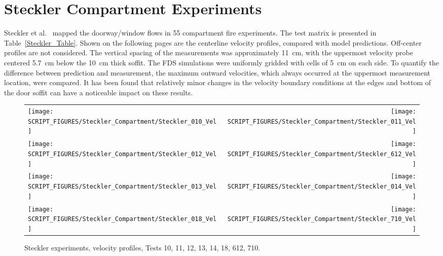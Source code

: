 \clearpage

\section{Steckler Compartment Experiments}

Steckler et al.~\cite{Steckler:NBSIR_82-2520} mapped the doorway/window flows in 55 compartment fire experiments. The test matrix is presented in Table~\ref{Steckler_Table}. Shown on the following pages are the centerline velocity profiles, compared with model predictions. Off-center profiles are not considered. The vertical spacing of the measurements was approximately 11~cm, with the uppermost velocity probe centered 5.7~cm below the 10~cm thick soffit. The FDS simulations were uniformly gridded with cells of 5~cm on each side. To quantify the difference between prediction and measurement, the maximum outward velocities, which always occurred at the uppermost measurement location, were compared. It has been found that relatively minor changes in the velocity boundary conditions at the edges and bottom of the door soffit can have a noticeable impact on these results.

\newpage

\begin{figure}[p]
\begin{tabular*}{\textwidth}{l@{\extracolsep{\fill}}r}
\texttt{[image: SCRIPT\_FIGURES/Steckler\_Compartment/Steckler\_010\_Vel]} &
\texttt{[image: SCRIPT\_FIGURES/Steckler\_Compartment/Steckler\_011\_Vel]} \\
\texttt{[image: SCRIPT\_FIGURES/Steckler\_Compartment/Steckler\_012\_Vel]} &
\texttt{[image: SCRIPT\_FIGURES/Steckler\_Compartment/Steckler\_612\_Vel]} \\
\texttt{[image: SCRIPT\_FIGURES/Steckler\_Compartment/Steckler\_013\_Vel]} &
\texttt{[image: SCRIPT\_FIGURES/Steckler\_Compartment/Steckler\_014\_Vel]} \\
\texttt{[image: SCRIPT\_FIGURES/Steckler\_Compartment/Steckler\_018\_Vel]} &
\texttt{[image: SCRIPT\_FIGURES/Steckler\_Compartment/Steckler\_710\_Vel]}
\end{tabular*}
\caption{Steckler experiments, velocity profiles, Tests 10, 11, 12, 13, 14, 18, 612, 710.}
\label{Steckler_Vel_1}
\end{figure}


